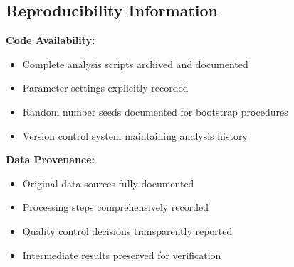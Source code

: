 \documentclass[12pt,a4paper]{article}
\begin{document}
\subsection{Reproducibility Information}

\textbf{Code Availability:}
\begin{itemize}
    \item Complete analysis scripts archived and documented
    \item Parameter settings explicitly recorded
    \item Random number seeds documented for bootstrap procedures
    \item Version control system maintaining analysis history
\end{itemize}

\textbf{Data Provenance:}
\begin{itemize}
    \item Original data sources fully documented
    \item Processing steps comprehensively recorded
    \item Quality control decisions transparently reported
    \item Intermediate results preserved for verification
\end{itemize}



\end{document}
